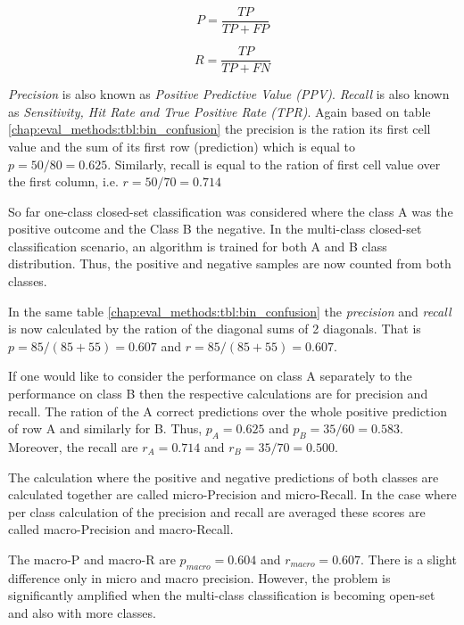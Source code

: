 {\begin{equation}\label{chap:eval_methods:eq:precision}
	P = \frac {TP} {TP + FP}
\end{equation}

\begin{equation}\label{chap:eval_methods:eq:recall}
	R = \frac {TP} {TP + FN}
\end{equation}

\textit{Precision} is also known as \textit{Positive Predictive Value (PPV)}. \textit{Recall} is also known as \textit{Sensitivity, Hit Rate and True Positive Rate (TPR)}. Again based on table \ref{chap:eval_methods:tbl:bin_confusion} the precision is the ration its first cell value and the sum of its first row (prediction) which is equal to $p = 50 / 80 = 0.625$. Similarly, recall is equal to the ration of first cell value over the first column, i.e. $r = 50 / 70 = 0.714$

So far one-class closed-set classification was considered where the class A was the positive outcome and the Class B the negative. In the multi-class closed-set classification scenario, an algorithm is trained for both A and B class distribution. Thus, the positive and negative samples are now counted from both classes.

In the same table \ref{chap:eval_methods:tbl:bin_confusion} the \textit{precision} and \textit{recall} is now calculated by the ration of the diagonal sums of 2 diagonals. That is $p = 85 / (85 + 55) = 0.607$ and $r = 85 / (85 + 55) = 0.607$. 

If one would like to consider the performance on class A separately to the performance on class B then the respective calculations are for precision and recall. The ration of the A correct predictions over the whole positive prediction of row A and similarly for B. Thus, $p_{A} = 0.625$ and $p_{B} = 35 / 60 = 0.583$. Moreover, the recall are $r_{A} = 0.714$ and $r_{B} = 35 / 70 = 0.500$.

The calculation where the positive and negative predictions of both classes are calculated together are called micro-Precision and micro-Recall. In the case where per class calculation of the precision and recall are averaged these scores are called macro-Precision and macro-Recall. 

The macro-P and macro-R are $p_{macro} = 0.604$ and $r_{macro} = 0.607$. There is a slight difference only in micro and macro precision. However, the problem is significantly amplified when the multi-class classification is becoming open-set and also with more classes.

}
